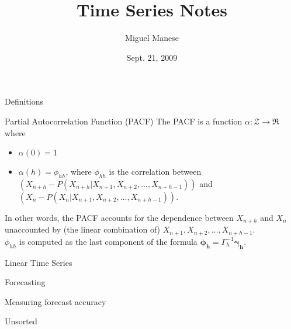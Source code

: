 \documentclass{article}
\title{Time Series Notes}
\author{Miguel Manese}
\date{Sept. 21, 2009}
\begin{document}
\maketitle

\begin{section}{Definitions}

\begin{subsection}{Partial Autocorrelation Function (PACF)}
The PACF is a function $\alpha : \mathcal{Z} \rightarrow \Re$ where

\begin{itemize}
\item $\alpha(0) = 1$
\item $\alpha(h) = \phi_{hh}$, where $\phi_{hh}$ is the correlation between
$(X_{n+h} - P(X_{n+h} | X_{n+1}, X_{n+2}, \ldots, X_{n+h-1}))$ and
$(X_{n} - P(X_{n} | X_{n+1}, X_{n+2}, \ldots, X_{n+h-1}))$. 
\end{itemize} 

\noindent In other words, the PACF accounts for the dependence between 
$X_{n+h}$ and 
$X_{n}$ unaccounted by (the linear combination of) $X_{n+1}, X_{n+2}, \ldots,
X_{n+h-1}$.\\

$\phi_{hh}$ is computed as the last component of the formula
$\mathbf{\phi_{h}} = \Gamma_{h}^{-1} \mathbf{\gamma_{h}}$. 
\end{subsection}
\end{section}


\begin{section}{Linear Time Series}
\end{section}

\begin{section}{Forecasting}
\begin{subsection}{Measuring forecast accuracy}
\end{subsection}
\end{section}

\begin{section}{Unsorted}
\end{section}
\end{document}
